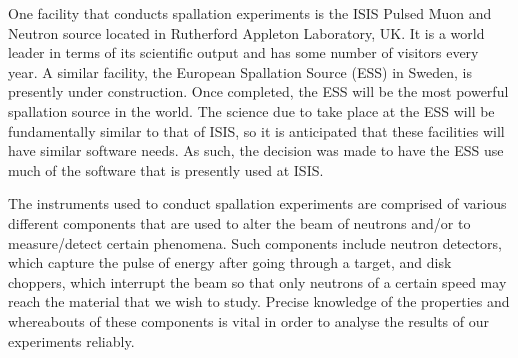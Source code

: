 One facility that conducts spallation experiments is the ISIS Pulsed Muon and Neutron source located in Rutherford Appleton Laboratory, UK. It is a world leader in terms of its scientific output and has some number of visitors every year. A similar facility, the European Spallation Source (ESS) in Sweden, is presently under construction. Once completed, the ESS will be the most powerful spallation source in the world. The science due to take place at the ESS will be fundamentally similar to that of ISIS, so it is anticipated that these facilities will have similar software needs. As such, the decision was made to have the ESS use much of the software that is presently used at ISIS.

The instruments used to conduct spallation experiments are comprised of various different components that are used to alter the beam of neutrons and/or to measure/detect certain phenomena. Such components include neutron detectors, which capture the pulse of energy after going through a target, and disk choppers, which interrupt the beam so that only neutrons of a certain speed may reach the material that we wish to study. Precise knowledge of the properties and whereabouts of these components is vital in order to analyse the results of our experiments reliably. 
